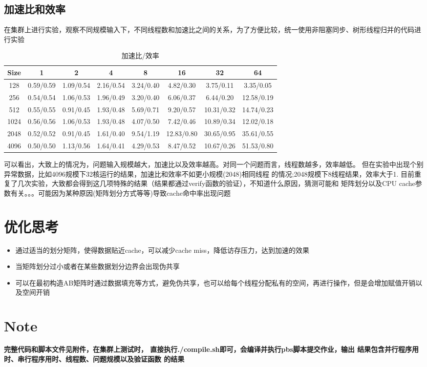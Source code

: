 \documentclass{article}
\begin{document}
\subsection{加速比和效率}
在集群上进行实验，观察不同规模输入下，不同线程数和加速比之间的关系，为了方便比较，统一使用非阻塞同步、树形线程归并的代码进行实验
\begin{table}[htbp]  
    \centering
    \caption{加速比/效率}  
    \begin{tabular}{cccccccc}
    \hline  
    Size&1&2&4&8&16&32&64 \\  
    \hline
    128&0.59/0.59&1.09/0.54&2.16/0.54&3.24/0.40&4.82/0.30&3.75/0.11&3.35/0.05 \\  
    256&0.54/0.54&1.06/0.53&1.96/0.49&3.20/0.40&6.06/0.37&6.44/0.20&12.58/0.19 \\  
    512&0.55/0.55&0.91/0.45&1.93/0.48&5.69/0.71&9.20/0.57&10.31/0.32&14.74/0.23 \\
    1024&0.56/0.56&1.06/0.53&1.93/0.48&4.07/0.50&7.42/0.46&10.89/0.34&12.02/0.18 \\
    2048&0.52/0.52&0.91/0.45&1.61/0.40&9.54/1.19&12.83/0.80&30.65/0.95&35.61/0.55 \\
    4096&0.50/0.50&1.13/0.56&1.64/0.41&4.29/0.53&8.47/0.52&10.67/0.26&51.53/0.80 \\
    \hline  
    \end{tabular}  
\end{table}  
\newline
可以看出，大致上的情况为，问题输入规模越大，加速比以及效率越高。对同一个问题而言，线程数越多，效率越低。
但在实验中出现个别异常数据，比如4096规模下32核运行的结果，加速比和效率不如更小规模(2048)相同线程
的情况;2048规模下8线程结果，效率大于1.
\newline 目前重复了几次实验，大致都会得到这几项特殊的结果（结果都通过verify函数的验证），不知道什么原因，猜测可能和
矩阵划分以及CPU cache参数有关。。。可能因为某种原因(矩阵划分方式等等)导致cache命中率出现问题
\newline

\section{优化思考}
\begin{itemize}
    \item 通过适当的划分矩阵，使得数据贴近cache，可以减少cache miss，降低访存压力，达到加速的效果
    \item 当矩阵划分过小或者在某些数据划分边界会出现伪共享
    \item 可以在最初构造AB矩阵时通过数据填充等方式，避免伪共享，也可以给每个线程分配私有的空间，再进行操作，但是会增加赋值开销以及空间开销
\end{itemize}

\section{Note}
\textbf{完整代码和脚本文件见附件，在集群上测试时，
直接执行./compile.sh即可，会编译并执行pbs脚本提交作业，输出
结果包含并行程序用时、串行程序用时、线程数、问题规模以及验证函数
的结果}
\end{document}
